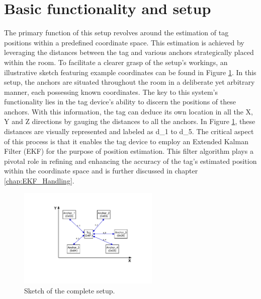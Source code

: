 \section{Basic functionality and setup}
The primary function of this setup revolves around the estimation of tag positions within a predefined coordinate space. 
This estimation is achieved by leveraging the distances between the tag and various anchors strategically placed within the room. 
To facilitate a clearer grasp of the setup's workings, an illustrative sketch featuring example coordinates can be found in Figure \ref{fig:setup_sketch}.
\vspace{4pt}
\newline
In this setup, the anchors are situated throughout the room in a deliberate yet arbitrary manner, each possessing known coordinates. 
The key to this system's functionality lies in the tag device's ability to discern the positions of these anchors. 
With this information, the tag can deduce its own location in all the X, Y and Z directions by gauging the distances to all the anchors.
\vspace{4pt}
\newline
In Figure \ref{fig:setup_sketch}, these distances are visually represented and labeled as d\_1 to d\_5. 
The critical aspect of this process is that it enables the tag device to employ an Extended Kalman Filter (EKF) for the purpose of position estimation. 
This filter algorithm plays a pivotal role in refining and enhancing the accuracy of the tag's estimated position within the coordinate space and is further discussed in chapter \ref{chap:EKF_Handling}. 

\begin{figure}[!hbt]
	\centering
	\includegraphics[width=0.6\textwidth]{pictures/Complete_Setup.pdf}
	\caption{Sketch of the complete setup.}
	\label{fig:setup_sketch}
\end{figure}













